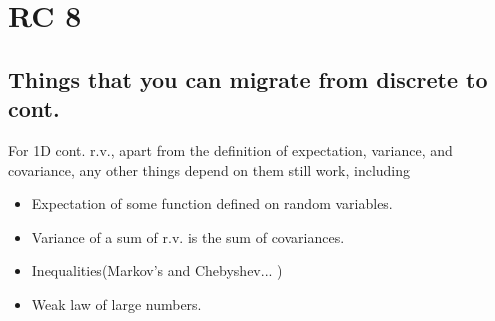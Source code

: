 \chapter{RC 8}



\section*{Things that you can migrate from discrete to cont.}
For 1D cont. r.v., apart from the definition of expectation, variance, and covariance, any other things depend on them still work, including
\begin{itemize}
    \item Expectation of some function defined on random variables. 
    \item Variance of a sum of r.v. is the sum of covariances. 
    \item Inequalities(Markov's and Chebyshev... )
    \item Weak law of large numbers.
\end{itemize}
 

